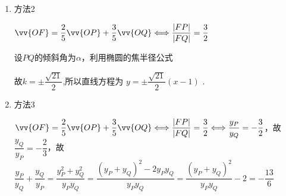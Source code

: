 \begin{enumerate}
\begin{jieda}
\begin{enumerate}
            若 ${x}_{1} = \dfrac{4{k}^{2} - 6\sqrt{{k}^{2} + 1}}{4{k}^{2} + 3},{x}_{2} = \dfrac{4{k}^{2} + 6\sqrt{{k}^{2} + 1}}{4{k}^{2} + 3}$ ,
            
            将其代入 $2{x}_{1} + 3{x}_{2} = 5$ 中得$2 \times  \dfrac{4{k}^{2} - 6\sqrt{{k}^{2} + 1}}{4{k}^{2} + 3} + 3 \times  \dfrac{4{k}^{2} + 6\sqrt{{k}^{2} + 1}}{4{k}^{2} + 3} = 5$ ,化简得 $2\sqrt{{k}^{2} + 1} = 5$
            
            解得 $k =  \pm  \dfrac{\sqrt{21}}{2}$ ,所以直线方程为 $y =  \pm  \dfrac{\sqrt{21}}{2}\left( {x - 1}\right)$ .

            \item 方法2

            $\vv{OF} = \dfrac{2}{5}\vv{OP} + \dfrac{3}{5}\vv{OQ} \Longleftrightarrow \dfrac{|FP|}{|FQ|} = \dfrac{3}{2}$

            设$PQ$的倾斜角为$\alpha$，利用椭圆的焦半径公式
            故$k = \pm \dfrac{\sqrt{21}}{2}$,所以直线方程为 $y =  \pm  \dfrac{\sqrt{21}}{2}\left( {x - 1}\right)$ .

            \item 方法3
            
            $\vv{OF} = \dfrac{2}{5}\vv{OP} + \dfrac{3}{5}\vv{OQ} \Longleftrightarrow \dfrac{|FP|}{|FQ|} = \dfrac{3}{2} \Longleftrightarrow \dfrac{y_P}{y_Q} = -\dfrac{3}{2}$，故$\dfrac{y_Q}{y_P} = -\dfrac{2}{3}$，故$\dfrac{y_P}{y_Q} + \dfrac{y_Q}{y_P} = \dfrac{y_P^2+y_Q^2}{y_Py_Q} = \dfrac{(y_P+y_Q)^2-2y_Py_Q}{y_Py_Q} = \dfrac{(y_P+y_Q)^2}{y_Py_Q} - 2 = -\dfrac{13}{6}$


\end{enumerate}
\end{jieda}
\end{enumerate}
